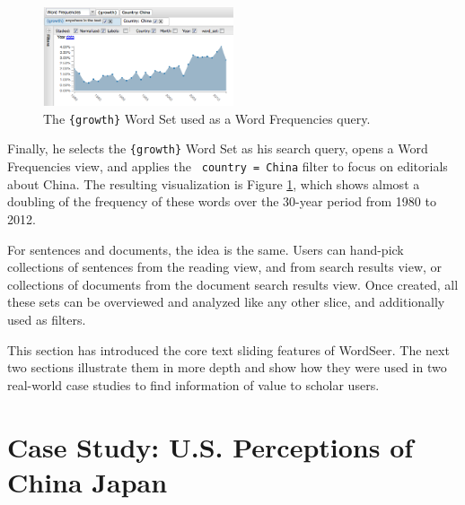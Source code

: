 \documentclass{sig-alternate}
\newcommand{\code}[1] {\texttt{#1}}
\begin{document}
\begin{enumerate}
\begin{figure}[ht!]
\begin{center}
	\includegraphics[width=0.5\textwidth]{fig/chris/04a.png}
\end{center}
    \caption{%
	The \code{\{growth\}} Word Set used as a Word Frequencies query.\label{fig:chris04a}
     }%
\end{figure}

Finally, he selects the  \code{\{growth\}} Word Set as his search query, opens a Word Frequencies view, and applies the \code{ country = China} filter to focus on editorials about China. The resulting visualization is Figure \ref{fig:chris04a}, which shows almost a doubling of the frequency of these words over the 30-year period from 1980 to 2012.

For sentences and documents, the idea is the same.  Users can hand-pick collections of sentences from the reading view, and from search results view, or collections of documents from the document search results view.  Once created, all these sets can be overviewed and analyzed like any other slice, and additionally used as filters.

This section has introduced the core text sliding features of WordSeer.  The next two sections illustrate them in more depth and show how they were used in two real-world case studies to find information of value to scholar users.

\section{Case Study: U.S. Perceptions of\\China Japan}


\end{enumerate}
\end{document}
